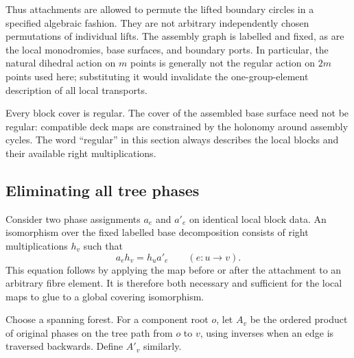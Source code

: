 Thus attachments are allowed to permute the lifted boundary circles in a
specified algebraic fashion. They are not arbitrary independently chosen
permutations of individual lifts. The assembly graph is labelled and fixed,
as are the local monodromies, base surfaces, and boundary ports.
In particular, the natural dihedral action on $m$ points is generally not
the regular action on $2m$ points used here; substituting it would invalidate
the one-group-element description of all local transports.

\begin{remark}
Every block cover is regular. The cover of the assembled base surface need
not be regular: compatible deck maps are constrained by the holonomy around
assembly cycles. The word ``regular'' in this section always describes the
local blocks and their available right multiplications.
\end{remark}

\subsection{Eliminating all tree phases}

Consider two phase assignments $a_e$ and $a'_e$ on identical local block data.
An isomorphism over the fixed labelled base decomposition consists of right
multiplications $h_v$ such that
\begin{equation}
 a_eh_v=h_ua'_e\qquad(e:u\to v).
 \label{eq:gauge}
\end{equation}
This equation follows by applying the map before or after the attachment to
an arbitrary fibre element. It is therefore both necessary and sufficient
for the local maps to glue to a global covering isomorphism.

Choose a spanning forest. For a component root $o$, let $A_v$ be the ordered
product of original phases on the tree path from $o$ to $v$, using inverses
when an edge is traversed backwards. Define $A'_v$ similarly.

